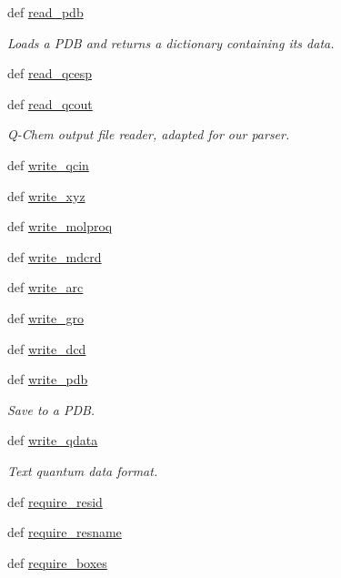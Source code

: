 \begin{DoxyCompactItemize}
def \hyperlink{classforcebalance_1_1molecule_1_1Molecule_afadc87c0cc32dc73558cd901a4c64dd4}{read\-\_\-pdb}
\begin{DoxyCompactList}\small\item\em \-Loads a \-P\-D\-B and returns a dictionary containing its data. \end{DoxyCompactList}\item 
def \hyperlink{classforcebalance_1_1molecule_1_1Molecule_a27fb6201b435a3b205ae62f605256f3d}{read\-\_\-qcesp}
\item 
def \hyperlink{classforcebalance_1_1molecule_1_1Molecule_a8c9e71843e7123c57c43c24af2d84f25}{read\-\_\-qcout}
\begin{DoxyCompactList}\small\item\em \-Q-\/\-Chem output file reader, adapted for our parser. \end{DoxyCompactList}\item 
def \hyperlink{classforcebalance_1_1molecule_1_1Molecule_af46b2ba6ef777cf8301bc16e157c724d}{write\-\_\-qcin}
\item 
def \hyperlink{classforcebalance_1_1molecule_1_1Molecule_adc6620e8287edabe161442de12295f75}{write\-\_\-xyz}
\item 
def \hyperlink{classforcebalance_1_1molecule_1_1Molecule_aba14226f272f91c91ecf7060ff136a2b}{write\-\_\-molproq}
\item 
def \hyperlink{classforcebalance_1_1molecule_1_1Molecule_aab5ea35ab9d68559fd6ea7b747c2bddb}{write\-\_\-mdcrd}
\item 
def \hyperlink{classforcebalance_1_1molecule_1_1Molecule_a95782abfb36e7080a1b98bfad2ced4f3}{write\-\_\-arc}
\item 
def \hyperlink{classforcebalance_1_1molecule_1_1Molecule_a503eae2cee228e4cc5fc736504714925}{write\-\_\-gro}
\item 
def \hyperlink{classforcebalance_1_1molecule_1_1Molecule_a0dee435704418bf51199d6bab6d92249}{write\-\_\-dcd}
\item 
def \hyperlink{classforcebalance_1_1molecule_1_1Molecule_a47082443566cd50add3f2ec20af9cc10}{write\-\_\-pdb}
\begin{DoxyCompactList}\small\item\em \-Save to a \-P\-D\-B. \end{DoxyCompactList}\item 
def \hyperlink{classforcebalance_1_1molecule_1_1Molecule_a1ef6aefd3218f8ab3f9dc2b37e602fbf}{write\-\_\-qdata}
\begin{DoxyCompactList}\small\item\em \-Text quantum data format. \end{DoxyCompactList}\item 
def \hyperlink{classforcebalance_1_1molecule_1_1Molecule_a90fe456919fda305703e36af389e60e1}{require\-\_\-resid}
\item 
def \hyperlink{classforcebalance_1_1molecule_1_1Molecule_ad47d05a3ea76e013a628bd7b25ae3050}{require\-\_\-resname}
\item 
def \hyperlink{classforcebalance_1_1molecule_1_1Molecule_a03af3cfb99ea8f1c8c7e93d04bdcf967}{require\-\_\-boxes}
\end{DoxyCompactItemize}
